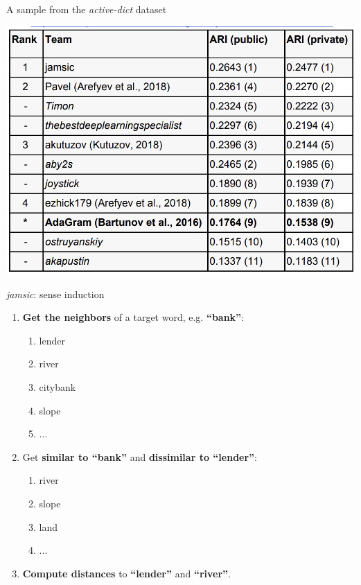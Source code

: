 \begin{frame}{A sample from the \textit{active-dict} dataset }

{\centering
\includegraphics[width=.8\textwidth]{figures/active}
}	
\end{frame}



\begin{frame}{ \textit{jamsic}: sense induction }

\begin{enumerate}
	\item \textbf{Get the neighbors} of a target word, e.g. \textbf{``bank''}:
	\begin{enumerate}
	\item \alert{lender}
	\item \textcolor{Cerulean}{river}
	\item \alert{citybank}
	\item \textcolor{Cerulean}{slope}
	\item ...
	\end{enumerate}
	
	\item Get \textbf{similar to ``bank''} and \textbf{dissimilar to \alert{``lender''}}:
	
	\begin{enumerate}
	\item \textcolor{Cerulean}{river}
	\item \textcolor{Cerulean}{slope}
	\item \textcolor{Cerulean}{land}
	\item ...
	\end{enumerate}
	 
\item \textbf{Compute distances} to \alert{\textbf{``lender''}} and \textcolor{Cerulean}{\textbf{``river''}}.
\end{enumerate}

\end{frame}


